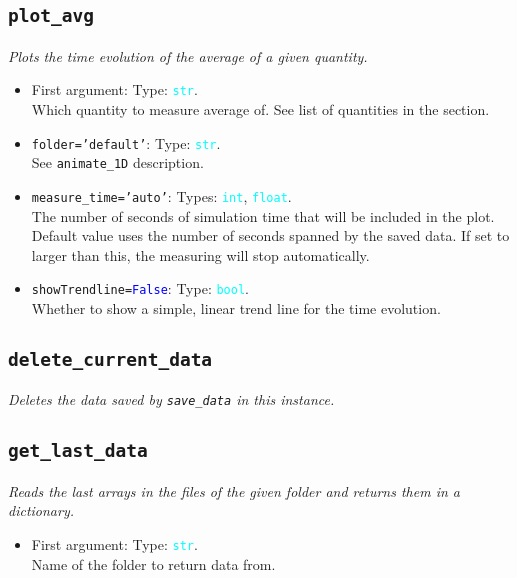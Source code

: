 \documentclass{article}
\newcommand{\ttt}[1]{\texttt{#1}}
\newcommand{\ptype}[1]{\texttt{\textcolor{cyan}{#1}}}
\newcommand{\cbl}[1]{\textcolor{blue}{#1}}
\newcommand{\cro}[1]{\textcolor{RedOrange}{#1}}
\newcommand{\cyo}[1]{\textcolor{YellowOrange}{#1}}
\begin{document}
\subsection{\ttt{plot\_avg}}
\label{sec:pa}
\textit{Plots the time evolution of the average of a given quantity.}
\begin{itemize}
	\item First argument: Type: \ptype{str}.\\Which quantity to measure average of. See list of quantities in the  section.
	\item \ttt{\cro{folder}=\cyo{'default'}}: Type: \ptype{str}.\\See \ttt{animate\_1D} description.
	\item \ttt{\cro{measure\_time}=\cyo{'auto'}}: Types: \ptype{int}, \ptype{float}.\\The number of seconds of simulation time that will be included in the plot. Default value uses the number of seconds spanned by the saved data. If set to larger than this, the measuring will stop automatically.
	\item \ttt{\cro{showTrendline}=\cbl{False}}: Type: \ptype{bool}.\\Whether to show a simple, linear trend line for the time evolution.
\end{itemize}

\subsection{\ttt{delete\_current\_data}}
\label{sec:dcd}
\textit{Deletes the data saved by \ttt{save\_data} in this instance.}

\subsection{\ttt{get\_last\_data}}
\label{sec:gld}
\textit{Reads the last arrays in the files of the given folder and returns them in a dictionary.}
\begin{itemize}
	\item First argument: Type: \ptype{str}.\\Name of the folder to return data from.
\end{itemize}
\end{document}
